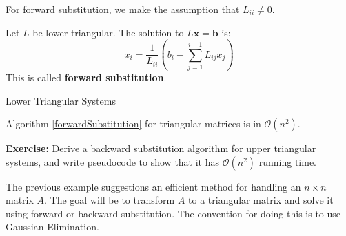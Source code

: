 \begin{marginfigure}
	For forward substitution, we make the assumption that $L_{ii} \neq 0$.
\end{marginfigure}

\begin{rmk}
	Let $L$ be lower triangular. The solution to $L \mathbf{x} = \mathbf{b}$ is:
	\[x_i=\frac{1}{L_{i i}}\left(b_i-\sum_{j=1}^{i-1} L_{i j} x_j\right)\]
	This is called \textbf{forward substitution}.
\end{rmk}

\begin{algorithm}
	  \caption{Lower Triangular Systems}\label{forwardSubstitution}
\end{algorithm}

\begin{rmk}
	Algorithm \ref{forwardSubstitution} for triangular matrices is in $\mathcal{O}(n^2)$.
\end{rmk}

\begin{marginfigure}
	\textbf{Exercise: } Derive a backward substitution algorithm for upper triangular systems, and write pseudocode to show that it has $\mathcal{O}(n^2)$ running time.
\end{marginfigure}

\NewLine

The previous example suggestions an efficient method for handling an $n \times n$ matrix $A$. The goal will be to transform $A$ to a triangular matrix and solve it using forward or backward substitution. The convention for doing this is to use Gaussian Elimination.

